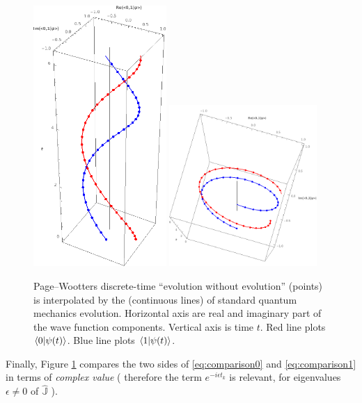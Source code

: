 \begin{figure}
  \centering
  \includegraphics[width=0.45\textwidth]{img/PWfit32.png}
  \includegraphics[width=0.5\textwidth]{img/PWfit32top.png}
  \caption[
    P-W vs Schr{\"o}dinger evolution (complex values)
  ]{
    Page--Wootters discrete-time ``evolution without evolution'' (points)
    is interpolated by the (continuous lines) of standard quantum mechanics
    evolution.
    Horizontal axis are real and imaginary part of the wave function components.
    Vertical axis is time $t$.
    Red   line plots {\color{red}   $\braket{0}{\psi(t)}$}.
    Blue  line plots {\color{blue}  $\braket{1}{\psi(t)}$}.
  }
  \label{fig:complex-comparison}
\end{figure}

Finally, Figure \ref{fig:complex-comparison} compares the two sides of
\eqref{eq:comparison0} and \eqref{eq:comparison1}
in terms of \emph{complex value}
(%
  therefore the term $e^{-i \epsilon t_k}$ is relevant,
  for eigenvalues $\epsilon \neq 0$ of $\hat{\mathbb{J}}$%
).

